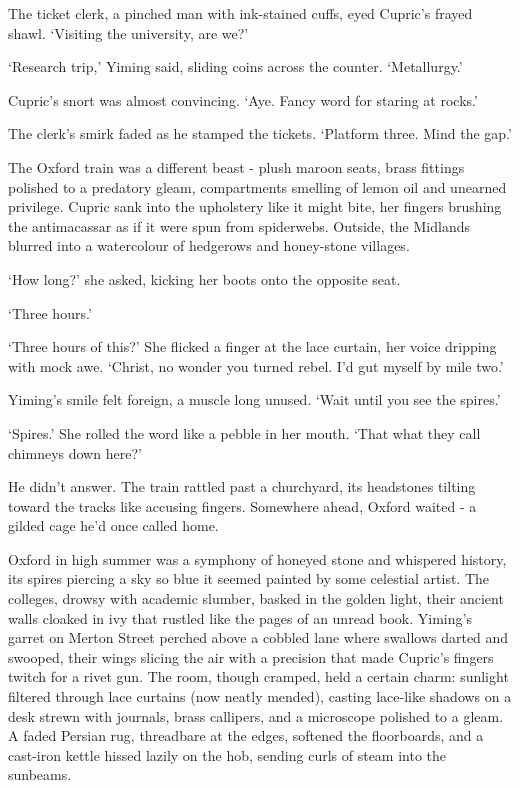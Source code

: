 The ticket clerk, a pinched man with ink-stained cuffs, eyed Cupric's frayed shawl. `Visiting the university, are we?'

`Research trip,' Yiming said, sliding coins across the counter. `Metallurgy.'

Cupric's snort was almost convincing. `Aye. Fancy word for staring at rocks.'

The clerk's smirk faded as he stamped the tickets. `Platform three. Mind the gap.'

The Oxford train was a different beast - plush maroon seats, brass fittings polished to a predatory gleam, compartments smelling of lemon oil and unearned privilege. Cupric sank into the upholstery like it might bite, her fingers brushing the antimacassar as if it were spun from spiderwebs. Outside, the Midlands blurred into a watercolour of hedgerows and honey-stone villages.

`How long?' she asked, kicking her boots onto the opposite seat.

`Three hours.'

`Three hours of this?' She flicked a finger at the lace curtain, her voice dripping with mock awe. `Christ, no wonder you turned rebel. I'd gut myself by mile two.'

Yiming's smile felt foreign, a muscle long unused. `Wait until you see the spires.'

`Spires.' She rolled the word like a pebble in her mouth. `That what they call chimneys down here?'

He didn't answer. The train rattled past a churchyard, its headstones tilting toward the tracks like accusing fingers. Somewhere ahead, Oxford waited - a gilded cage he'd once called home.

Oxford in high summer was a symphony of honeyed stone and whispered history, its spires piercing a sky so blue it seemed painted by some celestial artist. The colleges, drowsy with academic slumber, basked in the golden light, their ancient walls cloaked in ivy that rustled like the pages of an unread book. Yiming's garret on Merton Street perched above a cobbled lane where swallows darted and swooped, their wings slicing the air with a precision that made Cupric's fingers twitch for a rivet gun. The room, though cramped, held a certain charm: sunlight filtered through lace curtains (now neatly mended), casting lace-like shadows on a desk strewn with journals, brass callipers, and a microscope polished to a gleam. A faded Persian rug, threadbare at the edges, softened the floorboards, and a cast-iron kettle hissed lazily on the hob, sending curls of steam into the sunbeams.

